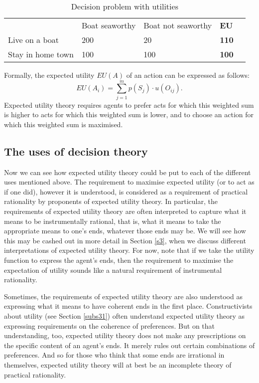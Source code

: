\begin{table}[ht]
\centering
\begin{tabular}{lllll}
\cline{2-4}
\multicolumn{1}{l|}{}                   & \multicolumn{1}{l|}{Boat seaworthy} & \multicolumn{1}{l|}{Boat not seaworthy} & \multicolumn{1}{l|}{\textbf{EU}} &  \\ \cline{1-4}
\multicolumn{1}{|l|}{Live on a boat}    & \multicolumn{1}{l|}{200}               & \multicolumn{1}{l|}{20}                    & \multicolumn{1}{l|}{\textbf{110}}              &  \\ \cline{1-4}
\multicolumn{1}{|l|}{Stay in home town} & \multicolumn{1}{l|}{100}               & \multicolumn{1}{l|}{100}                   & \multicolumn{1}{l|}{\textbf{100}}              &  \\ \cline{1-4}
\end{tabular}
\caption{Decision problem with utilities}
\label{t3}
\end{table}

Formally, the expected utility $EU(A)$ of an action can be expressed as follows:
$$EU(A_{i}) = \sum\limits_{j=1}^m p (S_j) \cdot u (O_{ij}).$$
Expected utility theory requires agents to prefer acts for which this weighted sum is higher to acts for which this weighted sum is lower, and to choose an action for which this weighted sum is maximised.

\subsection{The uses of decision theory}\label{subs13}

Now we can see how expected utility theory could be put to each of the different uses mentioned above. The requirement to maximise expected utility (or to act as if one did), however it is understood, is considered as a requirement of practical rationality by proponents of expected utility theory. In particular, the requirements of expected utility theory are often interpreted to capture what it means to be instrumentally rational, that is, what it means to take the appropriate means to one's ends, whatever those ends may be. We will see how this may be cashed out in more detail in Section \ref{s3}, when we discuss different interpretations of expected utility theory. For now, note that if we take the utility function to express the agent's ends, then the requirement to maximise the expectation of utility sounds like a natural requirement of instrumental rationality.

Sometimes, the requirements of expected utility theory are also understood as expressing what it means to have coherent ends in the first place. Constructivists about utility (see Section \ref{subs31}) often understand expected utility theory as expressing requirements on the coherence of preferences. But on that understanding, too, expected utility theory does not make any prescriptions on the specific content of an agent's ends. It merely rules out certain combinations of preferences. And so for those who think that some ends are irrational in themselves, expected utility theory will at best be an incomplete theory of practical rationality.

